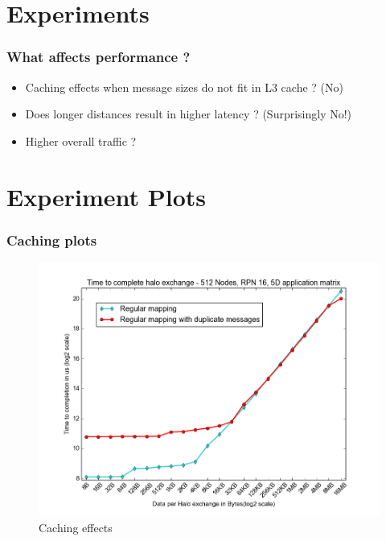 \documentclass{beamer}
\begin{document}
\section{Experiments}
\begin{frame}
\frametitle{What affects performance ?}
\begin{itemize}
\item Caching effects when message sizes do not fit in L3 cache ? (No)
\item Does longer distances result in higher latency ? (Surprisingly No!)
\item Higher overall traffic ?
\end{itemize}
\end{frame}

\section{Experiment Plots}
\begin{frame}
\frametitle{Caching plots}
\begin{figure}
\caption{Caching effects}
\includegraphics[width=0.8\linewidth]{../cache_duplicates_vs_regular.png}
\end{figure}
\end{frame}
\end{document}
